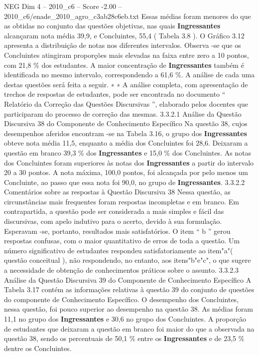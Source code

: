 \begin{textsample}{NEG Dim 4 – 2010\_c6 – Score -2.00 – 2010\_c6/enade\_2010\_agro\_c3ab28c6eb.txt}
Essas médias foram menores do que as obtidas no conjunto das questões objetivas, nas quais \textbf{Ingressantes} alcançaram nota média 39,9, e Concluintes, 55,4 ( Tabela 3.8 ).
O Gráfico 3.12 apresenta a distribuição de notas nos diferentes intervalos.
Observa -se que os Concluintes atingiram proporções mais elevadas na faixa entre zero a 10 pontos, com 21,8 \% dos estudantes.
A maior concentração de \textbf{Ingressantes} também é identificada no mesmo intervalo, correspondendo a 61,6 \%.
A análise de cada uma destas questões será feita a seguir. ∗ ∗ A análise completa, com apresentação de trechos de respostas de estudantes, pode ser encontrada no documento “ Relatório da Correção das Questões Discursivas ”, elaborado pelos docentes que participaram do processo de correção das mesmas. 3.3.2.1 Análise da Questão Discursiva 38 do Componente de Conhecimento Específico Na questão 38, cujos desempenhos aferidos encontram -se na Tabela 3.16, o grupo dos \textbf{Ingressantes} obteve nota média 11,5, enquanto a média dos Concluintes foi 28,6.
Deixaram a questão em branco 39,3 \% dos \textbf{Ingressantes} e 15,0 \% dos Concluintes.
As notas dos Concluintes foram superiores às notas dos \textbf{Ingressantes} a partir do intervalo 20 a 30 pontos.
A nota máxima, 100,0 pontos, foi alcançada por pelo menos um Concluinte, ao passo que essa nota foi 90,0, no grupo de \textbf{Ingressantes}. 3.3.2.2 Comentários sobre as respostas à Questão Discursiva 38 Nessa questão, as circunstâncias mais frequentes foram respostas incompletas e em branco.
Em contrapartida, a questão pode ser considerada a mais simples e fácil das discursivas, com apelo indutivo para o acerto, devido à sua formulação.
Esperavam -se, portanto, resultados mais satisfatórios.
O item “ b ” gerou respostas confusas, com o maior quantitativo de erros de toda a questão.
Um número significativo de estudantes respondeu satisfatoriamente ao item"a"( questão conceitual ), não respondendo, no entanto, aos itens"b"e"c", o que sugere a necessidade de obtenção de conhecimentos práticos sobre o assunto. 3.3.2.3 Análise da Questão Discursiva 39 do Componente de Conhecimento Específico A Tabela 3.17 contém as informações relativas à questão 39 do conjunto de questões do componente de Conhecimento Específico.
O desempenho dos Concluintes, nessa questão, foi pouco superior ao desempenho na questão 38.
As médias foram 11,1 no grupo dos \textbf{Ingressantes} e 30,6 no grupo dos Concluintes.
A proporção de estudantes que deixaram a questão em branco foi maior do que a observada na questão 38, sendo os percentuais de 50,1 \% entre os \textbf{Ingressantes} e de 23,5 \% dentre os Concluintes.

\end{textsample}
